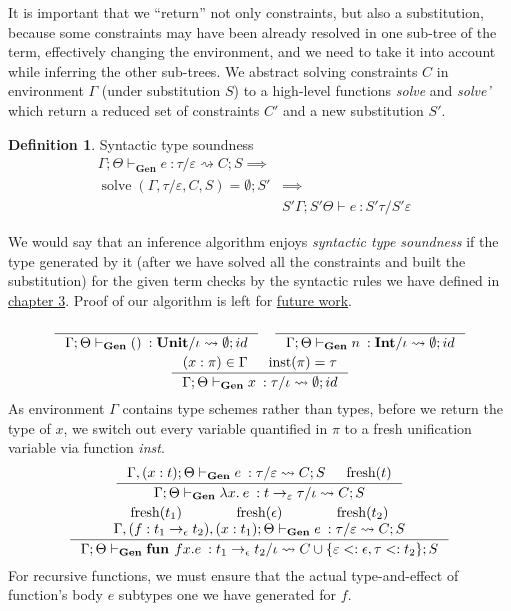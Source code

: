 \documentclass[declaration,shortabstract]{iithesis}
\theoremstyle{definition} \newtheorem{definition}{Definition}[section]
\newcommand{\types}[4][\Gamma;\Theta]{\ensuremath{{{#1} \vdash {#2} \: : {#3}/{#4}}}}
\newcommand{\gens}[6][\Gamma;\Theta]{\ensuremath{{{#1} \vdash_\textbf{Gen} {#2} \: : {#3}/{#4}} \rightsquigarrow {#5};{#6}}}
\newcommand{\arrow}[3]{{#1}\rightarrow_{#2}{#3}}
\newcommand{\lam}[1][x]{\ensuremath{\lambda #1.\:}}
\newcommand{\fresh}[1]{\ensuremath{\operatorname{fresh}({#1})}}
\begin{document}
It is important that we ``return'' not only constraints, but also a substitution, 
because some constraints may have been already resolved in
one sub-tree of the term, effectively changing the environment,
and we need to take it into account while inferring the other sub-trees.
We abstract solving constraints $C$ in environment $\Gamma$ (under substitution $S$) to
a high-level functions \textit{solve} and \textit{solve'} which return a reduced set of constraints $C'$ and
a new substitution $S'$. 
\theoremstyle{definition} 
\begin{definition}{Syntactic type soundness}
   $$
   \begin{aligned}
    \gens{e}{\tau}{\varepsilon}{C}{S} \implies& &\\
    \operatorname{solve}(\Gamma,\tau/\varepsilon, C, S) = \emptyset; S' & \implies & \\
      &\types[S'\Gamma;S'\Theta]{e}{S'\tau}{S'\varepsilon} &
    \end{aligned}
    $$
\end{definition}
We would say that an inference algorithm enjoys \textit{syntactic type soundness}
if the type generated by it (after we have solved all the constraints and built the substitution)
for the given term checks by the syntactic rules we have defined in \hyperlink{chapter.3}{chapter 3}.
Proof of our algorithm is left for \hyperlink{chapter.6}{future work}.

\setlength{\jot}{12pt}

\begin{gather*}
    \inference {}{\gens{()}{\textbf{Unit}}{\iota}{\emptyset}{id}}
    \quad
    \inference {}{\gens{n}{\textbf{Int}}{\iota}{\emptyset}{id}} {}
\\
    \inference {
        (x : \pi) \in \Gamma & \operatorname{inst}(\pi) = \tau
    }{
        \gens{x}{\tau}{\iota}{\emptyset}{id}
    }
\end{gather*}
As environment $\Gamma$ contains type schemes rather than types, before we return the type of $x$,
we switch out every variable quantified in $\pi$ to a fresh unification variable
via function \textit{inst}.
\begin{gather*}
     \inference{
        \gens[\Gamma, (x : t); \Theta]{e}{\tau}{\varepsilon}{C}{S} &
        \fresh{t}
    }{
        \gens{\lam e}{\arrow{t}{\varepsilon}{\tau}}{\iota}{C}{S}
    }
\\
    \inference{
        \fresh{t_1} &
        \fresh{\epsilon} &
        \fresh{t_2} \\
        \gens[\Gamma, (f : \arrow{t_1}{\epsilon}{t_2}),(x : t_1); \Theta]{e}{\tau}{\varepsilon}{C}{S}
    }{
        \gens{\textbf{fun } f x . e}{\arrow{t_1}{\epsilon}{t_2}}{\iota}
        {C \cup \{\varepsilon <: \epsilon, \tau <: t_2 \}}{S}
    }
\end{gather*}
For recursive functions, we must ensure that the actual type-and-effect of function's body $e$
subtypes one we have generated for $f$.
\end{document}
